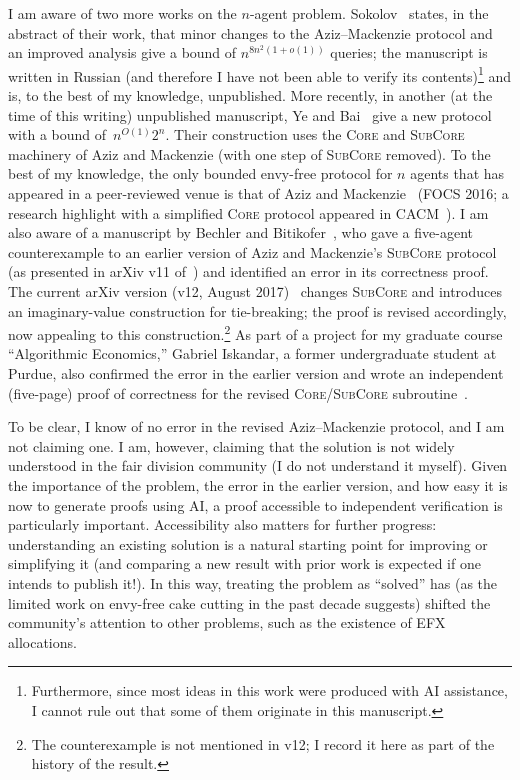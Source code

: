 \documentclass[11pt]{article}
\theoremstyle{plain}
\theoremstyle{definition}
\theoremstyle{plain}
\begin{document}
I am aware of two more works on the $n$-agent problem. Sokolov~\cite{sokolov2023exponential} states, in the abstract of their work, that minor changes to the Aziz--Mackenzie protocol and an improved analysis give a bound of $n^{8n^2(1+o(1))}$ queries; the manuscript is written in Russian (and therefore I have not been able to verify its contents)\footnote{Furthermore, since most ideas in this work were produced with AI assistance, I cannot rule out that some of them originate in this manuscript.} and is, to the best of my knowledge, unpublished. More recently, in another (at the time of this writing) unpublished manuscript, Ye and Bai~\cite{ye2026cutting} give a new protocol with a bound of~$n^{O(1)}2^n$. Their construction uses the \textsc{Core} and \textsc{SubCore} machinery of Aziz and Mackenzie (with one step of \textsc{SubCore} removed). To the best of my knowledge, the only bounded envy-free protocol for $n$ agents that has appeared in a peer-reviewed venue is that of Aziz and Mackenzie~\cite{aziz2016discrete} (FOCS 2016; a research highlight with a simplified \textsc{Core} protocol appeared in CACM~\cite{aziz2020bounded}). I am also aware of a manuscript by Bechler and Bitikofer~\cite{bechler2017counterexample}, who gave a five-agent counterexample to an earlier version of Aziz and Mackenzie's \textsc{SubCore} protocol (as presented in arXiv v11 of~\cite{aziz2016discrete}) and identified an error in its correctness proof. 
The current arXiv version (v12, August 2017)~\cite{aziz2017arxiv} changes \textsc{SubCore} and introduces an imaginary-value construction for tie-breaking; the proof is revised accordingly, now appealing to this construction.\footnote{The counterexample is not mentioned in v12; I record it here as part of the history of the result.} As part of a project for my graduate course ``Algorithmic Economics,'' Gabriel Iskandar, a former undergraduate student at Purdue, also confirmed the error in the earlier version and wrote an independent (five-page) proof of correctness for the revised \textsc{Core}/\textsc{SubCore} subroutine~\cite{gabe2024}. 



To be clear, I know of no error in the revised Aziz--Mackenzie protocol, and I am not claiming one. I am, however, claiming that the solution is not widely understood in the fair division community (I do not understand it myself). Given the importance of the problem, the error in the earlier version, and how easy it is now to generate proofs using AI, a proof accessible to independent verification is particularly important. Accessibility also matters for further progress: understanding an existing solution is a natural starting point for improving or simplifying it (and comparing a new result with prior work is expected if one intends to publish it!). In this way, treating the problem as ``solved'' has (as the limited work on envy-free cake cutting in the past decade suggests) shifted the community's attention to other problems, such as the existence of EFX allocations.
\end{document}
